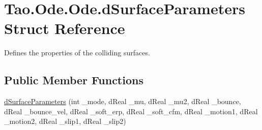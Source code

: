 \hypertarget{struct_tao_1_1_ode_1_1_ode_1_1d_surface_parameters}{
\section{Tao.Ode.Ode.dSurfaceParameters Struct Reference}
\label{struct_tao_1_1_ode_1_1_ode_1_1d_surface_parameters}
}


Defines the properties of the colliding surfaces.  


\subsection*{Public Member Functions}
\begin{DoxyCompactItemize}
\item 
\hyperlink{struct_tao_1_1_ode_1_1_ode_1_1d_surface_parameters_ace05e405fc79921fd890d0beb83a3d8c}{dSurfaceParameters} (int \_\-mode, dReal \_\-mu, dReal \_\-mu2, dReal \_\-bounce, dReal \_\-bounce\_\-vel, dReal \_\-soft\_\-erp, dReal \_\-soft\_\-cfm, dReal \_\-motion1, dReal \_\-motion2, dReal \_\-slip1, dReal \_\-slip2)
\end{DoxyCompactItemize}
